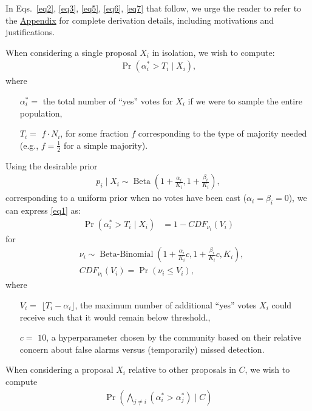 \documentclass[format=acmsmall, review=true, screen=true, anonymous=true]{acmart}
\begin{document}
In Eqs.~\eqref{eq2}, \eqref{eq3}, \eqref{eq5}, \eqref{eq6}, \eqref{eq7} that follow, we urge the reader to refer to the \hyperref[sec:derivation]{Appendix} for complete derivation details, including motivations and justifications.

When considering a single proposal $X_i$ in isolation, we wish to compute:
\begin{align}\label{eq1}
\Pr(\alpha^*_i > T_i \mid X_i),
\end{align}
where
\begin{itemize}
\item[$\alpha^*_i = $] the total number of ``yes'' votes for $X_i$ if we were to sample the entire population,
\item[$T_i = $] $f \cdot N_i$, for some fraction $f$ corresponding to the type of majority needed
(e.g., $f=\frac{1}{2}$ for a simple majority).
\end{itemize}
Using the desirable prior
\begin{align}\label{eq2}
p_i \mid X_i \sim \operatorname{Beta}(1+\frac{\alpha_i}{K_i},1+\frac{\beta_i}{K_i}),
\end{align}
corresponding to a uniform prior when no votes have been cast ($\alpha_i = \beta_i = 0$), we can express \eqref{eq1} as:
\begin{align}\label{eq3}
\Pr(\alpha^*_i > T_i \mid X_i) &= 1 - {CDF}_{\nu_i}(V_i)
\end{align}
for
\begin{align*}
&\nu_i \sim \operatorname{Beta-Binomial}(1 + \frac{\alpha_i}{K_i}c, 1 + \frac{\beta_i}{K_i}c, K_i),\\
&{CDF}_{\nu_i}(V_i)  = \Pr(\nu_i \leq V_i),
\end{align*}
where
\begin{itemize}
\item[$V_i = $] $\lfloor{T_i - \alpha_i}\rfloor$, the maximum number of additional ``yes'' votes $X_i$ could receive such that it would remain below threshold.,
\item[$c = $] $10$, a hyperparameter chosen by the community based on their relative concern about false alarms versus (temporarily) missed detection.
\end{itemize}

When considering a proposal $X_i$ relative to other proposals in $C$, we wish to compute
\begin{align}\label{eq4}
\Pr\left(\bigwedge_{j \neq i} (\alpha^*_i > \alpha^*_j) \mid C\right)
\end{align}
\end{document}
